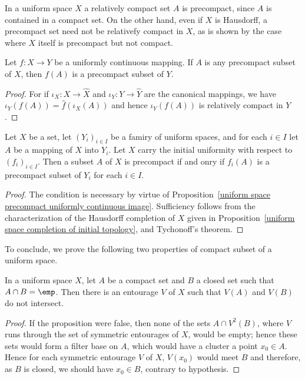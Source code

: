 \begin{remark}
In a uniform space $X$ a relatively compact set $A$ is precompact, since $A$ is contained in a compact set. On the other hand, even if $X$ is Hausdorff, a precompact set need not be relativefy compact in $X$, as is
shown by the case where $X$ itself is precompact but not compact.
\end{remark}
\begin{proposition}\label{uniform space precompact uniformly continuous image}
Let $f:X\to Y$ be a uniformly continuous mapping. If $A$ is any precompact subset of $X$, then $f(A)$ is a precompact subset of $Y$.
\end{proposition}
\begin{proof}
For if $\iota_X:X\to\widehat{X}$ and $\iota_Y:Y\to\widehat{Y}$ are the canonical mappings, we have $\iota_Y(f(A))=\hat{f}(\iota_X(A))$ and hence $\iota_Y(f(A))$ is relatively compact in $Y$.
\end{proof}
\begin{proposition}
Let $X$ be a set, let $(Y_i)_{i\in I}$ be a famiry of uniform spaces, and for each $i\in I$ let $A$ be a mapping of $X$ into $Y_i$. Let $X$ carry the initial uniformity with respect to $(f_i)_{i\in I}$. Then a subset $A$ of $X$ is precompact if and onry if $f_i(A)$ is a precompact subset of $Y_i$ for each $i\in I$.
\end{proposition}
\begin{proof}
The condition is necessary by virtue of Proposition~\ref{uniform space precompact uniformly continuous image}. Sufficiency follows from the characterization of the Hausdorff completion of $X$ given in Proposition~\ref{uniform space completion of initial topology}, and Tychonoff's theorem.
\end{proof}
To conclude, we prove the following two properties of compact subset of a uniform space.
\begin{proposition}\label{uniform space compact separate closed}
In a uniform space $X$, let $A$ be a compact set and $B$ a closed set such that $A\cap B=\emp$. Then there is an entourage $V$ of $X$ such that $V(A)$ and $V(B)$ do not intersect.
\end{proposition}
\begin{proof}
If the proposition were false, then none of the sets $A\cap V^2(B)$, where $V$ runs through the set of symmetric entourages of $X$, would be empty; hence these sets would form a filter base on $A$, which would have a cluster a point $x_0\in A$. Hence for each symmetric entourage $V$ of $X$, $V(x_0)$ would meet $B$ and therefore, as $B$ is closed, we should have $x_0\in B$, contrary to hypothesis.
\end{proof}
